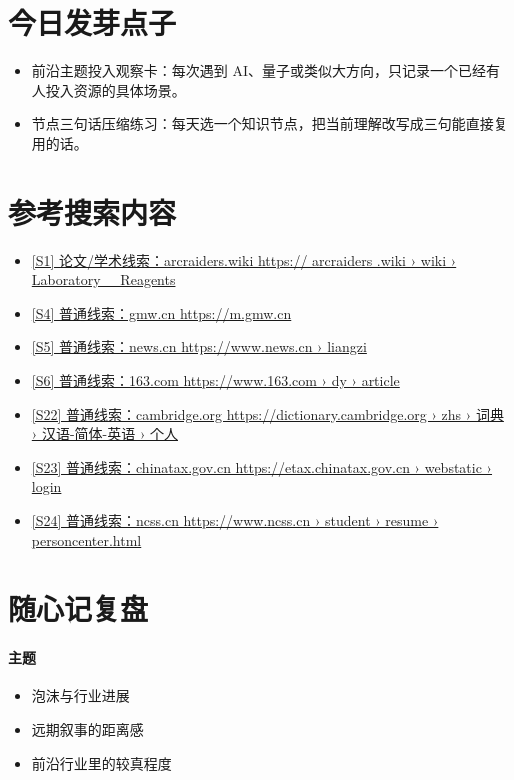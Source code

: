 \documentclass[UTF8,zihao=-4]{ctexart}
\begin{document}
\section*{今日发芽点子}
\begin{itemize}[leftmargin=2em]
\item 前沿主题投入观察卡：每次遇到 AI、量子或类似大方向，只记录一个已经有人投入资源的具体场景。
\item 节点三句话压缩练习：每天选一个知识节点，把当前理解改写成三句能直接复用的话。
\end{itemize}
\section*{参考搜索内容}
\begin{itemize}[leftmargin=2em]
\item \href{https://arcraiders.wiki/wiki/Laboratory_Reagents}{[S1] 论文/学术线索：arcraiders.wiki https:// arcraiders .wiki › wiki › Laboratory \_ Reagents}
\item \href{https://m.gmw.cn/2026-05/29/content_1304475334.htm}{[S4] 普通线索：gmw.cn https://m.gmw.cn}
\item \href{https://www.news.cn/liangzi/20260226/f23b02eb82ee4ef99bce79d61282aadc/c.html}{[S5] 普通线索：news.cn https://www.news.cn › liangzi}
\item \href{https://www.163.com/dy/article/KCI3KBUQ0511A3AG.html}{[S6] 普通线索：163.com https://www.163.com › dy › article}
\item \href{https://dictionary.cambridge.org/zhs/%E8%AF%8D%E5%85%B8/%E6%B1%89%E8%AF%AD-%E7%AE%80%E4%BD%93-%E8%8B%B1%E8%AF%AD/%E4%B8%AA%E4%BA%BA}{[S22] 普通线索：cambridge.org https://dictionary.cambridge.org › zhs › 词典 › 汉语-简体-英语 › 个人}
\item \href{https://etax.chinatax.gov.cn/webstatic/login}{[S23] 普通线索：chinatax.gov.cn https://etax.chinatax.gov.cn › webstatic › login}
\item \href{https://www.ncss.cn/student/m/resume/personcenter.html}{[S24] 普通线索：ncss.cn https://www.ncss.cn › student › resume › personcenter.html}
\end{itemize}
\section*{随心记复盘}
\paragraph{主题}
\begin{itemize}[leftmargin=2em]
\item 泡沫与行业进展
\item 远期叙事的距离感
\item 前沿行业里的较真程度
\end{itemize}
\end{document}
